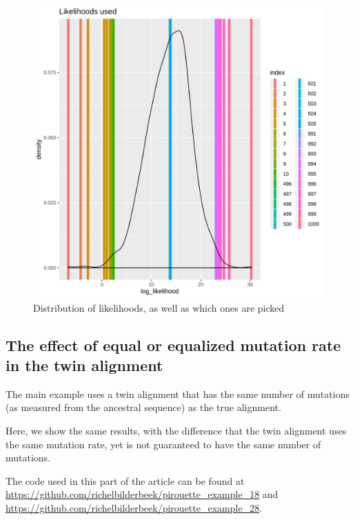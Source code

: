 \begin{figure}[H]
  \includegraphics[width=\textwidth]{pirouette_example_23/likelihoods.png}
  \caption{Distribution of likelihoods, as well as which ones are picked}
\end{figure}

\subsection{The effect of equal or equalized mutation rate in the twin alignment}
\label{subsec:different_n_mutations}
  
The main example uses a twin alignment that has the same number
of mutations (as measured from the ancestral sequence) as the true alignment.

Here, we show the same results, with the difference that
the twin alignment uses the same mutation rate, yet is not guaranteed
to have the same number of mutations.

The code used in this part of the article can be found at 
\url{https://github.com/richelbilderbeek/pirouette_example_18} and
\url{https://github.com/richelbilderbeek/pirouette_example_28}.

